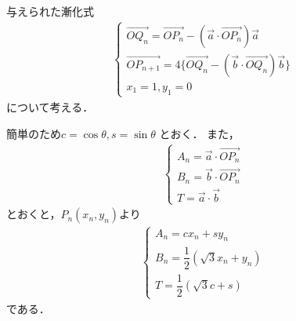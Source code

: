 \documentclass[../../main.tex]{subfiles}
\begin{document}
与えられた漸化式
\begin{align}
  \begin{cases}
    \overrightarrow{OQ_n}=\overrightarrow{OP_n}-(\vec{a}\cdot\overrightarrow{OP_n})\vec{a} \\
    \overrightarrow{OP_{n+1}}=4\{ \overrightarrow{OQ_n}-(\vec{b}\cdot\overrightarrow{OQ_n})\vec{b} \} \\
    x_1 = 1, y_1 = 0
  \end{cases} \label{eq:1}
\end{align}
について考える．

簡単のため$c = \cos\theta, s = \sin\theta$ とおく．
また，
\begin{align}
  \begin{cases}
    A_n = \vec{a} \cdot \overrightarrow{OP_n} \\
    B_n = \vec{b} \cdot \overrightarrow{OP_n} \\
    T = \vec{a} \cdot \vec{b}
  \end{cases}\label{eq:2}
\end{align}
とおくと，$P_n(x_n,y_n)$より
\begin{align}
  \begin{cases}
    A_n = cx_n + sy_n \\
    B_n = \dfrac{1}{2}\left(\sqrt{3}x_n+y_n\right) \\
    T   = \dfrac{1}{2}\left(\sqrt{3}c+s\right)
  \end{cases} \label{eq:3}
\end{align}
である．
\end{document}
